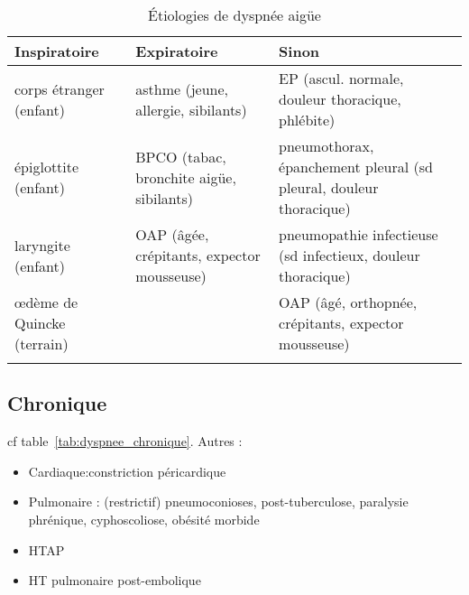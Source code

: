 \begin{table}[htbp]
\caption{Étiologies de dyspnée aigüe}
\label{tab:dyspnee_aigue}
\centering
\begin{adjustbox}{max width=\textwidth}
\begin{tabular}{lll}
\toprule
Inspiratoire & Expiratoire & Sinon\\
\midrule
corps étranger (enfant) & asthme (jeune, allergie, sibilants) & EP
                                                                (ascul. normale,
                                                                douleur
                                                                thoracique, phlébite)\\
épiglottite (enfant) & BPCO (tabac, bronchite aigüe, sibilants) & pneumothorax,
                                                                  épanchement
                                                                  pleural (sd
                                                                  pleural,
                                                                  douleur thoracique)\\
laryngite (enfant) & OAP (âgée, crépitants, expector mousseuse) & pneumopathie
                                                                  infectieuse
                                                                  (sd
                                                                  infectieux,
                                                                  douleur thoracique)\\
\oe{}dème de Quincke (terrain)&  & OAP (âgé, orthopnée, crépitants, expector mousseuse)\\
 &  & \\
\bottomrule
\end{tabular}
\end{adjustbox}
\end{table}

\subsection{Chronique}
cf table~\ref{tab:dyspnee_chronique}.
Autres :
\begin{itemize}
\item Cardiaque:constriction péricardique
\item Pulmonaire : (restrictif) pneumoconioses, post-tuberculose, paralysie phrénique, cyphoscoliose, obésité morbide
\item HTAP
\item HT pulmonaire post-embolique
\end{itemize}

